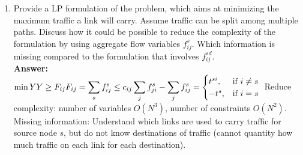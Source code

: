 \documentclass[a4paper]{article}
\begin{document}
\begin{enumerate}
\item Provide  a  LP  formulation  of  the  problem,  which  aims  at  minimizing  the   maximum  traffic  a  link  will  carry.  Assume  traffic  can  be  split  among   multiple  paths.  Discuss  how  it  could  be  possible  to  reduce  the  complexity   of  the  formulation  by  using  aggregate  flow  variables  $f_{ij}^{s}$. Which  information   is  missing  compared  to  the  formulation  that  involves $f_{ij}^{sd}$.\\
\textbf{Answer:}\\
\begin{math}
\min{Y} \\
Y \ge F_{ij} \\
F_{ij} = \displaystyle\sum\limits_{s} {f_{ij}^{s}} \le c_{ij} \\
\displaystyle\sum\limits_{j} {f_{ji}^{s}} - \displaystyle\sum\limits_{j} {f_{ij}^{s}} =
  \begin{cases}
  t^{si}, &\text{if $i \neq s$}\\
  -t^{s}, &\text{if $i = s$}
  \end{cases} \\
\end{math}
Reduce complexity: number of variables $O(N^3)$, number of constraints $O(N^2)$. \\
Missing information: Understand which links are used to carry traffic for source node $s$, but do not know destinations of traffic (cannot quantity how much traffic on each link for each destination).


\end{enumerate}
\end{document}
